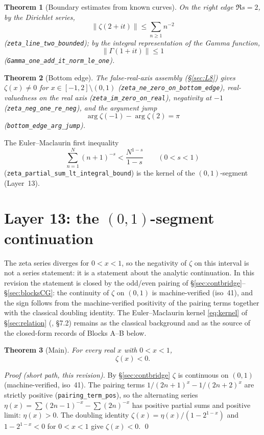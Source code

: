 \documentclass{article}
\newtheorem{theorem}{Theorem}[section]
\newcommand{\GG}{\Gamma}
\newcommand{\zt}{\zeta}
\begin{document}
\begin{theorem}[Boundary estimates from known curves]
\label{thm:boundary}
On the right edge $\Re s=2$, by the Dirichlet series,
\[
\|\zt(2+it)\|\le \sum_{n\ge 1}n^{-2}
\]
(\texttt{zeta\_line\_two\_bounded}); by the integral representation of the
Gamma function,
\[
\|\GG(1+it)\|\le 1
\]
(\texttt{Gamma\_one\_add\_it\_norm\_le\_one}).
\end{theorem}

\begin{theorem}[Bottom edge]
\label{thm:bottom}
The false-real-axis assembly (\S\ref{sec:L8}) gives $\zt(x)\neq 0$ for
$x\in[-1,2]\setminus(0,1)$ (\texttt{zeta\_ne\_zero\_on\_bottom\_edge}),
real-valuedness on the real axis (\texttt{zeta\_im\_zero\_on\_real}),
negativity at $-1$ (\texttt{zeta\_neg\_one\_re\_neg}), and the argument
jump
\[
\arg\zt(-1)-\arg\zt(2)=\pi
\]
(\texttt{bottom\_edge\_arg\_jump}).
\end{theorem}

The Euler--Maclaurin first inequality
\[
\sum_{n=1}^{N}(n+1)^{-s}<\frac{N^{1-s}}{1-s}\qquad(0<s<1)
\]
(\texttt{zeta\_partial\_sum\_lt\_integral\_bound}) is the kernel of the
$(0,1)$-segment (Layer~13).

\section{Layer 13: the $(0,1)$-segment continuation}
\label{sec:kernel}

The zeta series diverges for $0<x<1$, so the negativity of $\zt$ on this
interval is not a series statement: it is a statement about the analytic
continuation. In this revision the statement is closed by the odd/even
pairing of \S\ref{sec:contbridge}--\S\ref{sec:blocksCG}: the continuity of
$\zt$ on $(0,1)$ is machine-verified (iso~41), and the sign follows from
the machine-verified positivity of the pairing terms together with the
classical doubling identity. The Euler--Maclaurin kernel
\eqref{eq:kernel} of \S\ref{sec:relation} (\cite{whittaker}, \S7.2)
remains as the classical background and as the source of the closed-form
records of Blocks A--B below.

\begin{theorem}[Main]
\label{thm:main}
For every real $x$ with $0<x<1$,
\[
\zt(x)<0.
\]
\end{theorem}

\emph{Proof (short path, this revision).} By \S\ref{sec:contbridge} $\zt$
is continuous on $(0,1)$ (machine-verified, iso~41). The pairing terms
$1/(2n+1)^x-1/(2n+2)^x$ are strictly positive
(\texttt{pairing\_term\_pos}), so the alternating series
$\eta(x)=\sum(2n-1)^{-x}-\sum(2n)^{-x}$ has positive partial sums and
positive limit: $\eta(x)>0$. The doubling identity
$\zt(x)=\eta(x)/(1-2^{1-x})$ and $1-2^{1-x}<0$ for $0<x<1$ give
$\zt(x)<0$. \qed
\end{document}
